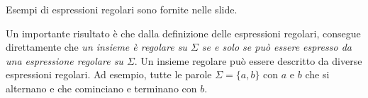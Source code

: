 \documentclass[10pt]{\classname}
\begin{document}
Esempi di espressioni regolari sono fornite nelle slide.

Un importante risultato è che dalla definizione delle espressioni regolari,
consegue direttamente che \emph{un insieme è regolare su $\Sigma$ se e solo se
può essere espresso da una espressione regolare su $\Sigma$}. Un insieme
regolare può essere descritto da diverse espressioni regolari. Ad esempio,
tutte le parole $\Sigma = \{a, b\}$ con $a$ e $b$ che si alternano e che
cominciano e terminano con $b$.
\end{document}
